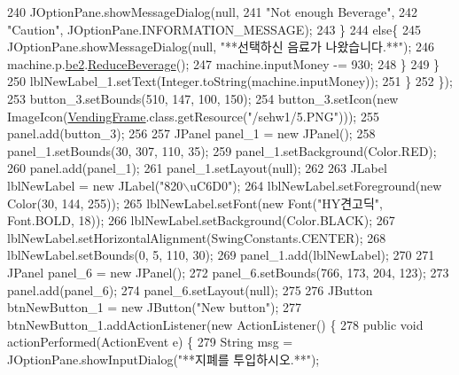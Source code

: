 \begin{DoxyCode}
240                         JOptionPane.showMessageDialog(null,
241                                 \textcolor{stringliteral}{"Not enough Beverage"}, 
242                                 \textcolor{stringliteral}{"Caution"}, JOptionPane.INFORMATION\_MESSAGE);
243                     \}
244                     \textcolor{keywordflow}{else}\{
245                         JOptionPane.showMessageDialog(null, \textcolor{stringliteral}{"**선택하신 음료가 나왔습니다.**"});
246                         machine.p.\hyperlink{classsehw1_1_1product_a970d42cefd2a8aba360fbc62e1dfcd6f}{be2}.\hyperlink{classsehw1_1_1beverage_ad2c40378698fb6c31c8f02bddb2a4e29}{ReduceBeverage}();
247                         machine.inputMoney -= 930;
248                     \}
249                 \}
250                 lblNewLabel\_1.setText(Integer.toString(machine.inputMoney));
251             \}
252         \});
253         button\_3.setBounds(510, 147, 100, 150);
254         button\_3.setIcon(\textcolor{keyword}{new} ImageIcon(\hyperlink{classsehw1_1_1_vending_frame_a82f3d8fe653c04d594b0a46e751328a0}{VendingFrame}.class.getResource(\textcolor{stringliteral}{"/sehw1/5.PNG"})));
255         panel.add(button\_3);
256         
257         JPanel panel\_1 = \textcolor{keyword}{new} JPanel();
258         panel\_1.setBounds(30, 307, 110, 35);
259         panel\_1.setBackground(Color.RED);
260         panel.add(panel\_1);
261         panel\_1.setLayout(null);
262         
263         JLabel lblNewLabel = \textcolor{keyword}{new} JLabel(\textcolor{stringliteral}{"820\(\backslash\)uC6D0"});
264         lblNewLabel.setForeground(\textcolor{keyword}{new} Color(30, 144, 255));
265         lblNewLabel.setFont(\textcolor{keyword}{new} Font(\textcolor{stringliteral}{"HY견고딕"}, Font.BOLD, 18));
266         lblNewLabel.setBackground(Color.BLACK);
267         lblNewLabel.setHorizontalAlignment(SwingConstants.CENTER);
268         lblNewLabel.setBounds(0, 5, 110, 30);
269         panel\_1.add(lblNewLabel);
270         
271         JPanel panel\_6 = \textcolor{keyword}{new} JPanel();
272         panel\_6.setBounds(766, 173, 204, 123);
273         panel.add(panel\_6);
274         panel\_6.setLayout(null);
275         
276         JButton btnNewButton\_1 = \textcolor{keyword}{new} JButton(\textcolor{stringliteral}{"New button"});
277         btnNewButton\_1.addActionListener(\textcolor{keyword}{new} ActionListener() \{
278             \textcolor{keyword}{public} \textcolor{keywordtype}{void} actionPerformed(ActionEvent e) \{
279                 String msg = JOptionPane.showInputDialog(\textcolor{stringliteral}{"**지폐를 투입하시오.**"});

\end{DoxyCode}
